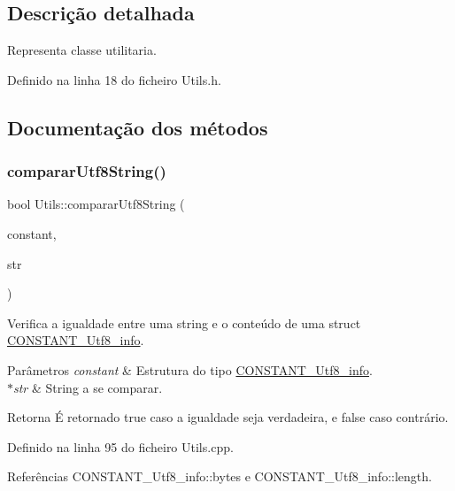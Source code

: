 \subsection{Descrição detalhada}
Representa classe utilitaria. 

Definido na linha 18 do ficheiro Utils.\+h.



\subsection{Documentação dos métodos}
\mbox{\label{classUtils_a63daf33599b447a8f3b2ea5aef2815ce}} 
\subsubsection{\texorpdfstring{comparar\+Utf8\+String()}{compararUtf8String()}}
{\footnotesize\ttfamily bool Utils\+::comparar\+Utf8\+String (\begin{DoxyParamCaption}\item[{\hyperlink{structCONSTANT__Utf8__info}{C\+O\+N\+S\+T\+A\+N\+T\+\_\+\+Utf8\+\_\+info}}]{constant,  }\item[{const char $\ast$}]{str }\end{DoxyParamCaption})\hspace{0.3cm}{\ttfamily [static]}}

Verifica a igualdade entre uma string e o conteúdo de uma struct {\ttfamily \hyperlink{structCONSTANT__Utf8__info}{C\+O\+N\+S\+T\+A\+N\+T\+\_\+\+Utf8\+\_\+info}}. 
\begin{DoxyParams}{Parâmetros}
{\em constant} & Estrutura do tipo {\ttfamily \hyperlink{structCONSTANT__Utf8__info}{C\+O\+N\+S\+T\+A\+N\+T\+\_\+\+Utf8\+\_\+info}}. \\
\hline
{\em $\ast$str} & String a se comparar. \\
\hline
\end{DoxyParams}
\begin{DoxyReturn}{Retorna}
É retornado {\ttfamily true} caso a igualdade seja verdadeira, e {\ttfamily false} caso contrário. 
\end{DoxyReturn}


Definido na linha 95 do ficheiro Utils.\+cpp.



Referências C\+O\+N\+S\+T\+A\+N\+T\+\_\+\+Utf8\+\_\+info\+::bytes e C\+O\+N\+S\+T\+A\+N\+T\+\_\+\+Utf8\+\_\+info\+::length.




